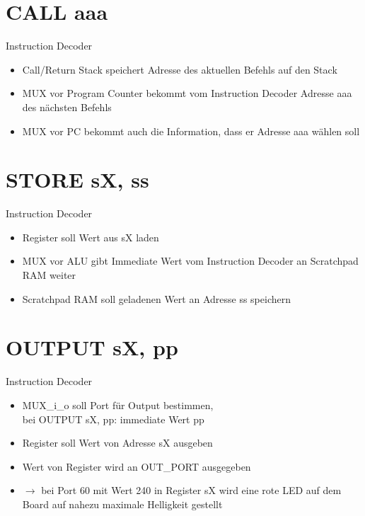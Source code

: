 \documentclass[10pt, t,
aspectratio=169,%
usenames,
dvipsnames,
]{beamer}
\begin{document}
	\section{CALL aaa}

	\begin{frame}{Instruction Decoder}
		\begin{itemize}
			\item Call/Return Stack speichert Adresse des aktuellen Befehls auf den Stack
			\item MUX vor Program Counter bekommt vom Instruction Decoder Adresse aaa des nächsten Befehls
			\item MUX vor PC bekommt auch die Information, dass er Adresse aaa wählen soll
		\end{itemize}
	\end{frame}

	\section{STORE sX, ss}

	\begin{frame}{Instruction Decoder}
		\begin{itemize}
			\item Register soll Wert aus sX laden
			\item MUX vor ALU gibt Immediate Wert vom Instruction Decoder an Scratchpad RAM weiter
			\item Scratchpad RAM soll geladenen Wert an Adresse ss speichern
		\end{itemize}
	\end{frame}

	\section{OUTPUT sX, pp}
	
	\begin{frame}{Instruction Decoder}
		\begin{itemize}
			\item MUX\_i\_o soll Port für Output bestimmen, \\ bei OUTPUT sX, pp: immediate Wert pp
			\item Register soll Wert von Adresse sX ausgeben
			\item Wert von Register wird an OUT\_PORT ausgegeben
			\item $\rightarrow$ bei Port 60 mit Wert 240 in Register sX wird eine rote LED auf dem Board auf nahezu maximale Helligkeit gestellt
		\end{itemize}
	\end{frame}
	
\end{document}
